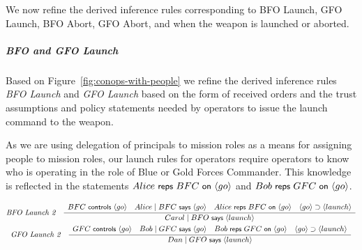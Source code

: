 We now refine the derived inference rules corresponding to BFO Launch,
GFO Launch, BFO Abort, GFO Abort, and when the weapon is launched or
aborted.

\subparagraph{BFO and GFO Launch}
\label{sec:bfo-gfo-launch}


Based on Figure~\ref{fig:conops-with-people} we refine the derived
inference rules \emph{BFO Launch} and \emph{GFO Launch} based on the
form of received orders and the trust assumptions and policy
statements needed by operators to issue the launch command to the
weapon.

As we are using delegation of principals to mission roles as a means
for assigning people to mission roles, our launch rules for operators
require operators to know who is operating in the role of Blue or Gold
Forces Commander. This knowledge is reflected in the statements
$\reps{Alice}{BFC}{\action{go}}$ and $\reps{Bob}{GFC}{\action{go}}$.

\begin{footnotesize}
  \begin{gather*}
    \irule {
      \begin{array}{c}
        BFC \controls \action{go} \quad Alice \quoting BFC \says \action{go} \quad 
        \reps{Alice}{BFC}{\action{go}} \quad \action{go} \implies \action{launch}
      \end{array}
    } {Carol \quoting BFO \says \action{launch}}
    {BFO Launch 2} \\
    \irule {
      \begin{array}{c}
        GFC \controls \action{go} \quad Bob \quoting GFC \says \action{go} \quad 
        \reps{Bob}{GFC}{\action{go}} \quad \action{go} \implies \action{launch}
      \end{array}
    } {Dan \quoting GFO \says \action{launch}} {GFO Launch 2}
  \end{gather*}
\end{footnotesize}

